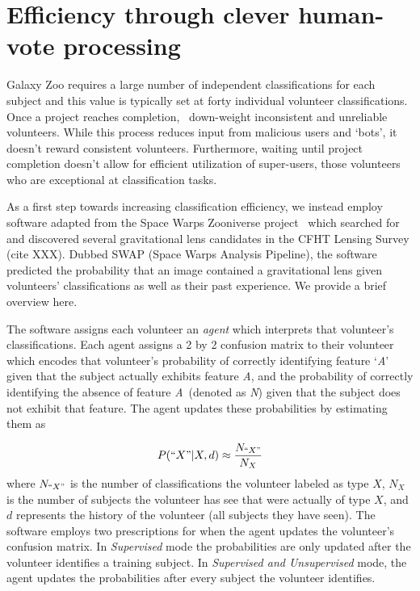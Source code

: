 \documentclass[twocolumn]{aastex6}
\newcommand{\A}{\textit{A}}
\newcommand{\N}{\textit{N}}
\begin{document}
\section{Efficiency through clever human-vote processing}\label{sec: SWAP}

Galaxy Zoo requires a large number of independent classifications for each subject and
 this value is typically set at forty individual volunteer classifications. 
Once a project reaches completion,~\cite{Willett2013} down-weight inconsistent 
and unreliable volunteers.  
While this process reduces input from malicious users and `bots', 
it doesn't reward consistent volunteers. Furthermore, waiting until project completion 
doesn't allow for efficient utilization of super-users, those volunteers who are 
exceptional at classification tasks.

As a first step towards increasing classification efficiency, we instead employ 
software adapted from the Space Warps Zooniverse project~\citep{Marshall2016} 
which searched for and discovered several gravitational lens 
candidates in the CFHT Lensing Survey (cite XXX).  Dubbed SWAP (Space Warps Analysis Pipeline),  
the software predicted the probability that an image contained a gravitational lens given 
volunteers' classifications as well as their past experience. We provide a brief overview here.  

The software assigns each volunteer an \textit{agent} which interprets that volunteer's 
classifications. Each agent assigns a 2 by 2 confusion matrix to their volunteer which encodes
that volunteer's probability of correctly identifying feature `\A'  given that the subject 
actually exhibits feature \A, and the probability of correctly identifying
the absence of feature \A~(denoted as \N) given that the subject does not exhibit 
that feature. The agent updates these probabilities by estimating them as 

\begin{equation}
P(``X" | X, d) \approx \frac{N_{``X"}}{N_{X}}
\end{equation}
where $N_{``X"}$ is the number of classifications the volunteer labeled as type $X$, 
$N_X$ is the number of subjects the volunteer has see that were actually of type $X$,
and $d$ represents the history of the volunteer (all subjects they have seen). 
The software employs two prescriptions for when the 
agent updates the volunteer's confusion matrix. In \textit{Supervised} mode the 
probabilities are only updated after the volunteer identifies a training subject.
In \textit{Supervised and Unsupervised} mode, the agent
updates the probabilities after every subject the volunteer identifies.  
\end{document}
